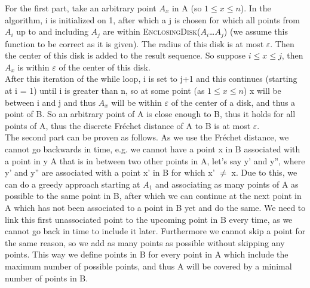 \documentclass[a4paper,11pt]{article}
\begin{document}
For the first part, take an arbitrary point $A_x$ in A (so $1 \leq x \leq n$). In the algorithm, i is initialized on 1, after which a j is chosen for which all points from $A_i$ up to and including $A_j$ are within \textsc{EnclosingDisk($A_i$\dots $A_j$)} (we assume this function to be correct as it is given). The radius of this disk is at most $\varepsilon$. Then the center of this disk is added to the result sequence. So suppose $i \leq x \leq j$, then $A_x$ is within $\varepsilon$ of the center of this disk.\\
After this iteration of the while loop, i is set to j+1 and this continues (starting at i = 1) until i is greater than n, so at some point (as $1 \leq x \leq n$) x will be between i and j and thus $A_x$ will be within $\varepsilon$ of the center of a disk, and thus a point of B. So an arbitrary point of A is close enough to B, thus it holds for all points of A, thus the discrete Fr\'{e}chet distance of A to B is at most $\varepsilon$.\\

The second part can be proven as follows. As we use the Fr\'{e}chet distance, we cannot go backwards in time, e.g. we cannot have a point x in B associated with a point in y A that is in between two other points in A, let's say y' and y'', where y' and y'' are associated with a point x' in B for which x' $\neq$ x. Due to this, we can do a greedy approach starting at $A_1$ and associating as many points of A as possible to the same point in B, after which we can continue at the next point in A which has not been associated to a point in B yet and do the same. We need to link this first unassociated point to the upcoming point in B every time, as we cannot go back in time to include it later. Furthermore we cannot skip a point for the same reason, so we add as many points as possible without skipping any points. This way we define points in B for every point in A which include the maximum number of possible points, and thus A will be covered by a minimal number of points in B.
\end{document}
